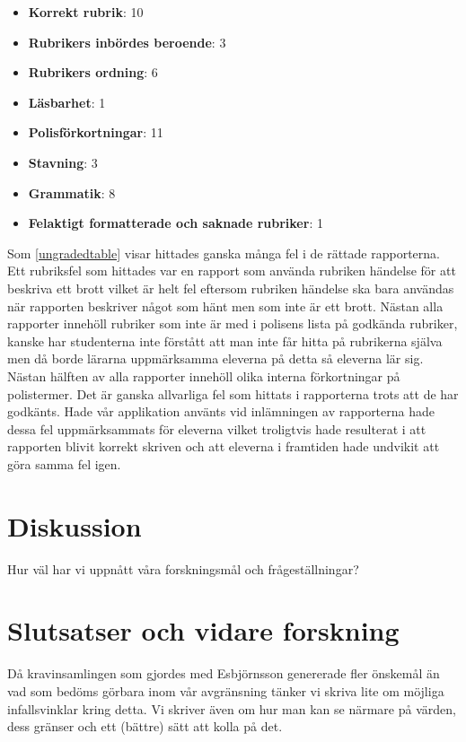 \documentclass[swedish]{maucsthesis}
\begin{document}
\begin{itemize}
\item \textbf{Korrekt rubrik}:  10
\item \textbf{Rubrikers inbördes beroende}: 3
\item \textbf{Rubrikers ordning}: 6
\item \textbf{Läsbarhet}: 1
\item \textbf{Polisförkortningar}: 11
\item \textbf{Stavning}: 3
\item \textbf{Grammatik}: 8
\item \textbf{Felaktigt formatterade och saknade rubriker}: 1
\end{itemize}

Som \cref{ungradedtable} visar hittades ganska många fel i de rättade rapporterna. 
Ett rubriksfel som hittades var en rapport som använda rubriken händelse för att beskriva ett brott vilket
är helt fel eftersom rubriken händelse ska bara användas när rapporten beskriver något som hänt men som inte är ett brott.
Nästan alla rapporter innehöll rubriker som inte är med i polisens lista på godkända rubriker, kanske har studenterna
inte förstått att man inte får hitta på rubrikerna själva men då borde lärarna uppmärksamma eleverna på detta så
eleverna lär sig. Nästan hälften av alla rapporter innehöll olika interna förkortningar på polistermer.
Det är ganska allvarliga fel som hittats i rapporterna trots att de har godkänts. Hade vår applikation använts
vid inlämningen av rapporterna hade dessa fel uppmärksammats för eleverna vilket troligtvis hade resulterat
i att rapporten blivit korrekt skriven och att eleverna i framtiden hade undvikit att göra samma fel igen.


\section{Diskussion}
Hur väl har vi uppnått våra forskningsmål och frågeställningar?
\section{Slutsatser och vidare forskning}\label{slutsatserochvidareforskning}
Då kravinsamlingen som gjordes med Esbjörnsson genererade fler önskemål än
vad som bedöms görbara inom vår avgränsning tänker vi skriva lite om möjliga
infallsvinklar kring detta.
Vi skriver även om hur man kan se närmare på värden, dess gränser och ett (bättre) sätt att kolla på det.

%
\newpage
{}




%
\end{document}
